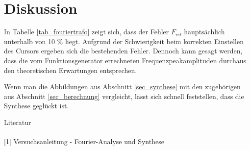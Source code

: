 \section{Diskussion}
In Tabelle \ref{tab_fouriertrafo} zeigt sich, dass der Fehler $F_{rel}$ hauptsächlich unterhalb von 10 \% liegt. Aufgrund der 
Schwierigkeit beim korrekten Einstellen des Cursors ergeben sich die bestehenden Fehler. Dennoch kann gesagt werden, dass die
vom Funktionsgenerator errechneten Frequenzpeakamplituden durchaus den theoretischen Erwartungen entsprechen. 

Wenn man die Abbildungen aus Abschnitt \ref{sec_synthese} mit den zugehörigen aus Abschnitt \ref{sec_berechnung} vergleicht, lässt
sich schnell feststellen, dass die Synthese geglückt ist. 

\parskip 220pt
\Large{Literatur}\\\\
\large{[1] Versuchsanleitung - Fourier-Analyse und Synthese}





